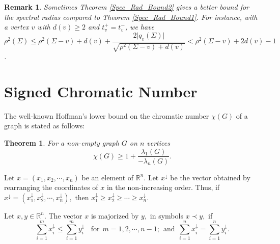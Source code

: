 \documentclass[12pt]{article}
\theoremstyle{plain}
\newtheorem{theorem}{Theorem}[section]
\newtheorem*{remark}{Remark}
\numberwithin{equation}{section}
\begin{document}
	\begin{remark}
		Sometimes Theorem \ref{Spec_Rad_Bound2} gives a better bound for the spectral radius compared to Theorem \ref{Spec_Rad_Bound1}. For instance, with a vertex $v$ with $d(v) \geq 2$ and $t_v^+=t_v^-$, we have $ \rho^2(\Sigma) \leq \rho^2(\Sigma-v)+d(v)+\dfrac{2\vert q_v(\Sigma) \vert}{\sqrt{\rho^2(\Sigma-v)+d(v)}}<\rho^2(\Sigma-v)+2d(v)-1$. 
	\end{remark}
	
	\section{Signed Chromatic Number }\label{section_chromatic}
	The well-known Hoffman's lower bound on the chromatic number $\chi(G)$ of a graph is stated as follows:
	\begin{theorem}\emph{\cite{hoffman2003eigenvalues}}\label{Hoffman_bound}
		For a non-empty graph $G$ on $n$ vertices $$\chi(G) \geq 1 +\dfrac{\lambda_1(G)}{-\lambda_n(G)}.$$
	\end{theorem}
	Let $x=(x_{1}, x_{2},\cdots, x_{n} )$ be an element of $\mathbb{R}^{n}.$ Let $x^{\downarrow}$ be the vector obtained by rearranging the coordinates of $x$ in the non-increasing order. Thus, if $x^{\downarrow}=(x_{1}^{\downarrow}, x_{2}^{\downarrow},\cdots, x_{n}^{\downarrow}),$ then  $x_{1}^{\downarrow}\geq x_{2}^{\downarrow}\geq\cdots\geq x_{n}^{\downarrow}.$ 
	
	Let $x, y \in \mathbb{R}^{n}$. The vector $x$ is majorized by $y,$ in symbols $x \prec y,$ if \[ \sum_{i=1}^{m}x_{i}^{\downarrow} \leq \sum_{i=1}^{m}y_{i}^{\downarrow} ~~~~\mbox{for}~~ m=1, 2, \cdots, n-1; ~~\mbox{and}~~ \sum_{i=1}^{n}x_{i}^{\downarrow} = \sum_{i=1}^{n}y_{i}^{\downarrow}.\]
	
\end{document}
